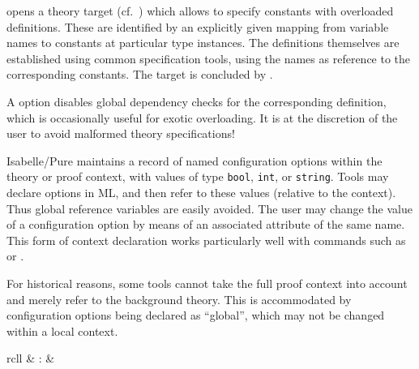 \begin{isabellebody}
\begin{isamarkuptext}
\begin{descr}
  \item [\mbox{\isa{\isacommand{overloading}}}~\isa{x\isactrlsub {\isadigit{1}}\ {\isasymequiv}\ c\isactrlsub {\isadigit{1}}\ {\isacharcolon}{\isacharcolon}\ {\isasymtau}\isactrlsub {\isadigit{1}}\ {\isasymAND}\ {\isasymdots}\ x\isactrlsub n\ {\isasymequiv}\ c\isactrlsub n\ {\isacharcolon}{\isacharcolon}\ {\isasymtau}\isactrlsub n\ {\isasymBEGIN}}]
  opens a theory target (cf.\ ) which allows to
  specify constants with overloaded definitions.  These are identified
  by an explicitly given mapping from variable names  to constants  at particular type
  instances.  The definitions themselves are established using common
  specification tools, using the names  as
  reference to the corresponding constants.  The target is concluded
  by \mbox{}.

  A  option disables global dependency checks for
  the corresponding definition, which is occasionally useful for
  exotic overloading.  It is at the discretion of the user to avoid
  malformed theory specifications!

  \end{descr}%
\end{isamarkuptext}%
\isamarkuptrue%
%
\isamarkuptrue%
%
\begin{isamarkuptext}%
Isabelle/Pure maintains a record of named configuration options
  within the theory or proof context, with values of type \verb|bool|, \verb|int|, or \verb|string|.  Tools may declare
  options in ML, and then refer to these values (relative to the
  context).  Thus global reference variables are easily avoided.  The
  user may change the value of a configuration option by means of an
  associated attribute of the same name.  This form of context
  declaration works particularly well with commands such as \mbox{} or \mbox{}.

  For historical reasons, some tools cannot take the full proof
  context into account and merely refer to the background theory.
  This is accommodated by configuration options being declared as
  ``global'', which may not be changed within a local context.

  \begin{matharray}{rcll}
    \mbox{} & : &  \\
  \end{matharray}


\end{isamarkuptext}
\end{isabellebody}
